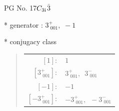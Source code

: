 \documentclass[fleqn,8pt]{jsarticle}
\begin{document}
\setcounter{MaxMatrixCols}{32}

\renewcommand{\tablename}{Table~}
\renewcommand{\figurename}{Figure~}
\begin{center}
\LARGE
PG No. 17\quad$C_{\rm 3i}$\quad$\bar{3}$\quad[ trigonal ]
\end{center}

* generator : $3^{+}_{\,\,001},\,\,-1$

* conjugacy class
\begin{quote}
\begin{tabular}{rl}
$ [1]: $ & $ 1 $ \\
$ [3^{+}_{\,\,001}]: $ & $ 3^{+}_{\,\,001},\,\,\,3^{-}_{\,\,001} $ \\
$ [-1]: $ & $ -1 $ \\
$ [-3^{+}_{\,\,001}]: $ & $ -3^{+}_{\,\,001},\,\,\,-3^{-}_{\,\,001} $
\end{tabular}
\end{quote}
\end{document}
